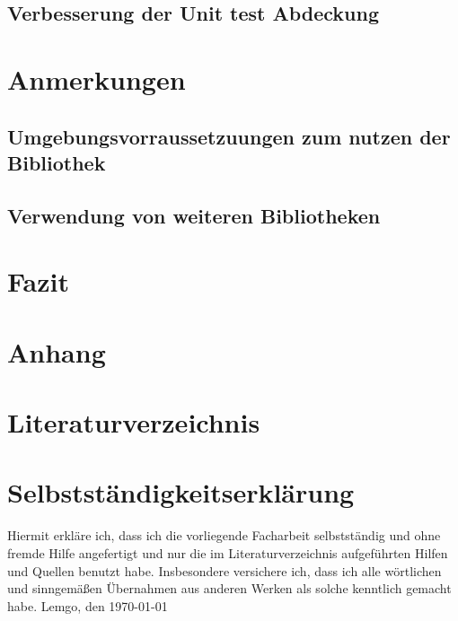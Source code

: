 \documentclass[a4paper,12pt,titlepage,ngerman,bibliography=totocnumbered]{article}
\begin{document}
\begin{sloppypar}
  \subsection{Verbesserung der Unit test Abdeckung}\label{subsec:MoreUnitTests}
  \section{Anmerkungen}\label{sec:AdditionalNotes}
  \subsection{Umgebungsvorraussetzuungen zum nutzen der Bibliothek}\label{subsec:SystemRequirements}
  \subsection{Verwendung von weiteren Bibliotheken}\label{subsec:UsageOfLibraries}
  \section{Fazit}\label{sec:Conclusion}
  \section{Anhang}\label{sec:anhang}
  \section{Literaturverzeichnis}\label{sec:Literature}
  \printbibliography[heading=none]
  \section{Selbstständigkeitserklärung}\label{sec:IDidThisMyself}
  Hiermit erkläre ich, dass ich die vorliegende Facharbeit selbstständig und ohne fremde Hilfe angefertigt und nur die im Literaturverzeichnis
  aufgeführten Hilfen und Quellen benutzt habe.
  Insbesondere versichere ich, dass ich alle wörtlichen
  und sinngemä\ss en Übernahmen aus anderen Werken als solche kenntlich gemacht habe.
  \medskip
  Lemgo, den \today
  \medskip
 \end{sloppypar}
\end{document}
